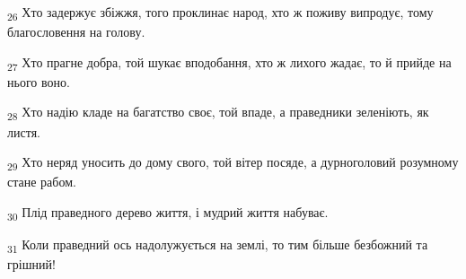 \begin{tcolorbox}
\textsubscript{26} Хто задержує збіжжя, того проклинає народ, хто ж поживу випродує, тому благословення на голову.
\end{tcolorbox}
\begin{tcolorbox}
\textsubscript{27} Хто прагне добра, той шукає вподобання, хто ж лихого жадає, то й прийде на нього воно.
\end{tcolorbox}
\begin{tcolorbox}
\textsubscript{28} Хто надію кладе на багатство своє, той впаде, а праведники зеленіють, як листя.
\end{tcolorbox}
\begin{tcolorbox}
\textsubscript{29} Хто неряд уносить до дому свого, той вітер посяде, а дурноголовий розумному стане рабом.
\end{tcolorbox}
\begin{tcolorbox}
\textsubscript{30} Плід праведного дерево життя, і мудрий життя набуває.
\end{tcolorbox}
\begin{tcolorbox}
\textsubscript{31} Коли праведний ось надолужується на землі, то тим більше безбожний та грішний!
\end{tcolorbox}
